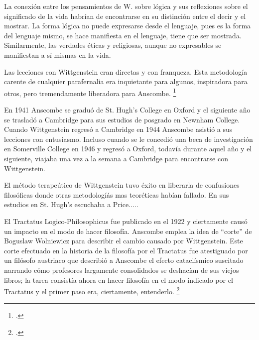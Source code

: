 
La conexión entre los pensamientos de W. sobre lógica y sus reflexiones sobre el
significado de la vida habrían de encontrarse en su distinción entre el decir y
el mostrar. La forma lógica no puede expresarse desde el lenguaje, pues es la
forma del lenguaje mismo, se hace manifiesta en el lenguaje, tiene que ser
mostrada. Similarmente, las verdades éticas y religiosas, aunque no expresables
se manifiestan a sí mismas en la vida. 

Las lecciones con Wittgenstein eran directas y con franqueza. Esta metodología
carente de cualquier parafernalia era inquietante para algunos, inspiradora para
otros, pero tremendamente liberadora para Anscombe. \footcite[loc 9853 Chapter
4, Section 24, para. 5]{monk}

En 1941 Anscombe se graduó de St. Hugh's College en Oxford y el siguiente año se
trasladó a Cambridge para sus estudios de posgrado en Newnham College. Cuando
Wittgenstein regresó a Cambridge en 1944 Anscombe asistió a sus lecciones con
entusiasmo. Incluso cuando se le concedió una beca de investigación en
Somerville College en 1946 y regresó a Oxford, todavía durante aquel año y el
siguiente, viajaba una vez a la semana a Cambridge para encontrarse con
Wittgenstein.  

El método terapeútico de Wittgenstein tuvo éxito en liberarla de confusiones
filosóficas donde otras metodologíás mas teoréticas habían fallado. En sus
estudios en St. Hugh's escuchaba a Price.....



El Tractatus Logico-Philosophicus fue publicado en el 1922 y ciertamente causó
un impacto en el modo de hacer filosofía. Anscombe emplea la idea de ``corte''
de Boguslaw Wolniewicz para describir el cambio causado por Wittgenstein. Este
corte efectuado en la historia de la filosofía por el Tractatus fue atestiguado
por un filósofo austriaco que describió a Anscombe el efecto cataclísmico
suscitado narrando cómo profesores largamente consolidados se deshacían de sus
viejos libros; la tarea consistía ahora en hacer filosofía en el modo indicado
por el Tractatus y el primer paso era, ciertamente, entenderlo.
\footcite[p.181]{twocuts} 


